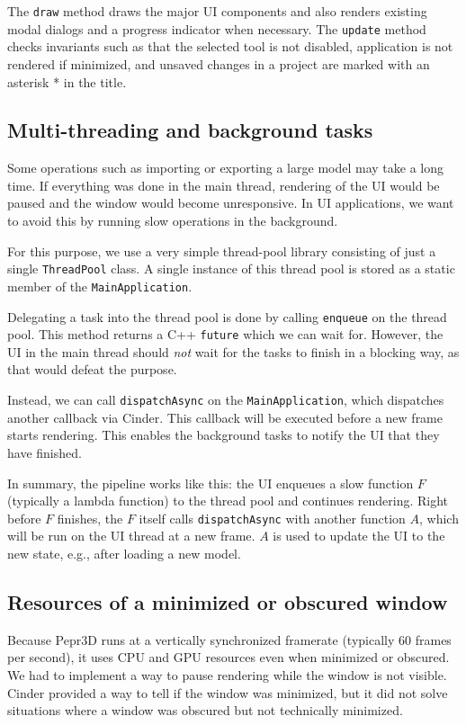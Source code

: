 The \texttt{draw} method draws the major UI components and also renders existing modal dialogs and a progress indicator when necessary.
The \texttt{update} method checks invariants such as that the selected tool is not disabled, application is not rendered if minimized, and unsaved changes in a project are marked with an asterisk * in the title.

\subsection{Multi-threading and background tasks}

Some operations such as importing or exporting a large model may take a long time.
If everything was done in the main thread, rendering of the UI would be paused and the window would become unresponsive.
In UI applications, we want to avoid this by running slow operations in the background.

For this purpose, we use a very simple thread-pool library consisting of just a single \texttt{ThreadPool} class.
A single instance of this thread pool is stored as a static member of the \texttt{MainApplication}.

Delegating a task into the thread pool is done by calling \texttt{enqueue} on the thread pool.
This method returns a C++ \texttt{future} which we can wait for.
However, the UI in the main thread should \emph{not} wait for the tasks to finish in a blocking way, as that would defeat the purpose.

Instead, we can call \texttt{dispatchAsync} on the \texttt{MainApplication}, which dispatches another callback via Cinder.
This callback will be executed before a new frame starts rendering.
This enables the background tasks to notify the UI that they have finished.

In summary, the pipeline works like this: the UI enqueues a slow function $F$ (typically a lambda function) to the thread pool and continues rendering.
Right before $F$ finishes, the $F$ itself calls \texttt{dispatchAsync} with another function $A$, which will be run on the UI thread at a new frame.
$A$ is used to update the UI to the new state, e.g., after loading a new model.

\subsection{Resources of a minimized or obscured window}

Because Pepr3D runs at a vertically synchronized framerate (typically 60 frames per second), it uses CPU and GPU resources even when minimized or obscured.
We had to implement a way to pause rendering while the window is not visible.
Cinder provided a way to tell if the window was minimized, but it did not solve situations where a window was obscured but not technically minimized.

